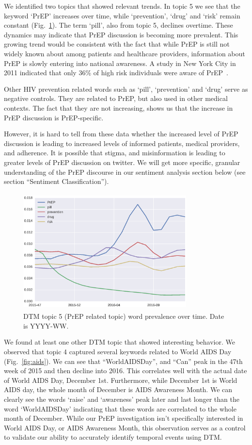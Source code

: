 \documentclass[conference]{IEEEtran}
\begin{document}
We identified two topics that showed relevant trends. In topic 5 we see that the keyword `PrEP' increases over time, while `prevention', `drug' and `risk' remain constant (Fig.~\ref{fig:prep}). The term `pill', also from topic 5, declines overtime. These dynamics may indicate that PrEP discussion is becoming more prevalent. This growing trend would be consistent with the fact that while PrEP is still not widely known about among patients and healthcare providers, information about PrEP is slowly entering into national awareness. A study in New York City in 2011 indicated that only 36\% of high risk individuals were aware of PrEP~\cite{mehta2011awareness}.

Other HIV prevention related words such as `pill', `prevention' and `drug' serve as negative controls. They are related to PrEP, but also used in other medical contexts. The fact that they are not increasing, shows us that the increase in PrEP discussion is PrEP-specific.

However, it is hard to tell from these data whether the increased level of PrEP discussion is leading to increased levels of informed patients, medical providers, and adherence. It is possible that stigma, and misinformation is leading to greater levels of PrEP discussion on twitter. We will get more specific, granular understanding of the PrEP discourse in our sentiment analysis section below (see section ``Sentiment Classification'').

\begin{figure}
\centering
\includegraphics[height=2.5in, width=3.5in]{figs/Fig3}
\caption{DTM topic 5 (PrEP related topic) word prevalence over time. Date is YYYY-WW.}
\label{fig:prep}
\end{figure}

We found at least one other DTM topic that showed interesting behavior. We observed that topic 4 captured several keywords related to World AIDS Day (Fig.~\ref{fig:aids}). We can see that ``WorldAIDSDay'', and ``Can'' peak in the 47th week of 2015 and then decline into 2016. This correlates well with the actual date of World AIDS Day, December 1st. Furthermore, while December 1st is World AIDS day, the whole month of December is AIDS Awareness Month. We can clearly see the words `raise' and `awareness' peak later and last longer than the word `WorldAIDSDay' indicating that these words are correlated to the whole month of December. While our PrEP investigation isn't specifically interested in World AIDS Day, or AIDS Awareness Month, this observation serves as a control to validate our ability to accurately identify temporal events using DTM. 
\end{document}
